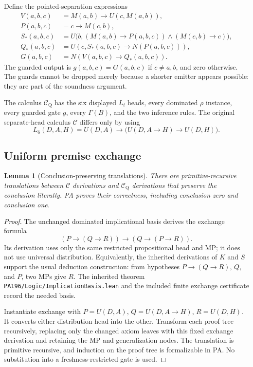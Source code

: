 \documentclass[11pt,letterpaper]{article}
\newcommand{\file}[1]{\texttt{\nolinkurl{#1}}}
\newcommand{\CQ}{\mathcal C_{\mathrm Q}}
\newcommand{\CC}{\mathcal C}
\newtheorem{lemma}[theorem]{Lemma}
\begin{document}
Define the pointed-separation expressions
\begin{align*}
 V(a,b,c)&=M(a,b)\to U(c,M(a,b)),\\
 P(a,b,c)&=c\to M(c,b),\\
 S_*(a,b,c)&=U\bigl(b,(M(a,b)\to P(a,b,c))
                         \wedge(M(c,b)\to c)\bigr),\\
 Q_*(a,b,c)&=U(c,S_*(a,b,c)\to N(P(a,b,c))),\\
 G(a,b,c)&=N(V(a,b,c)\to Q_*(a,b,c)).
\end{align*}
The guarded output is $g(a,b,c)=G(a,b,c)$ if $c\ne a,b$, and zero
otherwise. The guards cannot be dropped merely because a shorter
emitter appears possible: they are part of the soundness argument.

The calculus $\CQ$ has the six displayed $L_i$ heads, every dominated
$\rho$ instance, every guarded gate $g$, every $\Gamma(B)$, and the two
inference rules. The original separate-head calculus $\CC$ differs
only by using
\[
 L_6(D,A,H)=U(D,A)\to
              \bigl(U(D,A\to H)\to U(D,H)\bigr).
\]

\subsection{Uniform premise exchange}

\begin{lemma}[Conclusion-preserving translations]\label{lem:exchange}
There are primitive-recursive translations between $\CC$ derivations
and $\CQ$ derivations that preserve the conclusion literally. PA proves
their correctness, including conclusion zero and conclusion one.
\end{lemma}
\begin{proof}
The unchanged dominated implicational basis derives the exchange formula
\[
 (P\to(Q\to R))\to(Q\to(P\to R)).
\]
Its derivation uses only the same restricted propositional head and MP;
it does not use universal distribution. Equivalently, the inherited
derivations of $K$ and $S$ support the usual deduction construction:
from hypotheses $P\to(Q\to R)$, $Q$, and $P$, two MPs give $R$.
The inherited theorem \file{PA196/Logic/ImplicationBasis.lean}
and the included finite exchange certificate record the needed basis.

Instantiate exchange with $P=U(D,A)$, $Q=U(D,A\to H)$,
$R=U(D,H)$. It converts either distribution head into the other.
Transform each proof tree recursively, replacing only the changed
axiom leaves with this fixed exchange derivation and retaining the MP
and generalization nodes. The translation is primitive recursive, and
induction on the proof tree is formalizable in PA. No substitution
into a freshness-restricted gate is used.
\end{proof}
\end{document}
